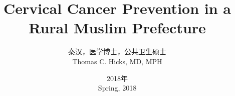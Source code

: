\documentclass{beamer}
\begin{document}
\begin{CJK*}{UTF8}{gbsn}

	\title[One Woman's Health]{Cervical Cancer Prevention in a Rural Muslim Prefecture}
	\author[秦汉]{秦汉，医学博士，公共卫生硕士\\ Thomas C. Hicks, MD, MPH}
	\date{2018年\\Spring, 2018}

\begin{frame}
	\titlepage
\end{frame}




\end{CJK*}
\end{document}
